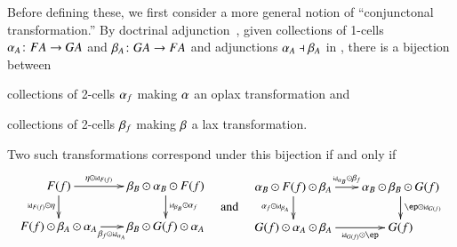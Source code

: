 Before defining these, we first consider a more general notion of ``conjunctonal transformation.''
By doctrinal adjunction~\cite{kelly:doc-adjn}, given collections of
1-cells $\alpha_A\colon FA\to GA$ and $\beta_A\colon GA\to FA$ and
adjunctions $\alpha_A\dashv \beta_A$ in \cB, there is a bijection between
\begin{inparaenum}
\item collections of 2-cells $\alpha_f$ making $\alpha$ an oplax
  transformation and
\item collections of 2-cells $\beta_f$ making $\beta$ a lax
  transformation.
\end{inparaenum}
Two such transformations correspond under this bijection if and only if
\begin{equation}
  \vcenter{\xymatrix@-.5pc{F(f) \ar[r]^-{\eta \odot \mbox{\tiny id}_{F(f)}}
      \ar[d]_{\mbox{\tiny id}_{F(f)}\odot \eta} &
      \be_B\odot \al_B \odot F(f) \ar[d]^{\mbox{\tiny id}_{\be_B} \odot \al_f}\\
      F(f) \odot \be_A\odot \al_A\ar[r]_-{\be_f \odot \mbox{\tiny id}_{\al_A}} &
      \be_B\odot G(f) \odot \al_A}}
  \quad\text{and}\quad
  \vcenter{\xymatrix@-.5pc{\al_B\odot F(f)\odot \be_A
      \ar[r]^-{\mbox{\tiny id}_{\al_B}\odot \be_f}\ar[d]_{\al_f \odot \mbox{\tiny id}_{\be_A}}&
      \al_B \odot \be_B \odot G(f)\ar[d]^{\ep \odot \mbox{\tiny id}_{G(f)}}\\
      G(f)\odot \al_A\odot \be_A \ar[r]_-{\mbox{\tiny id}_{G(f)} \odot \ep} & G(f)}}\label{eq:conjtrans}
\end{equation}


